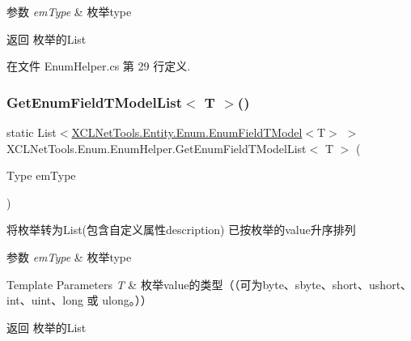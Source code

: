 \begin{DoxyParams}{参数}
{\em em\+Type} & 枚举type\\
\hline
\end{DoxyParams}
\begin{DoxyReturn}{返回}
枚举的\+List
\end{DoxyReturn}


在文件 Enum\+Helper.\+cs 第 29 行定义.

\mbox{\label{class_x_c_l_net_tools_1_1_enum_1_1_enum_helper_a919aa80b589b8038b8db6f731b50556d}} 
\subsubsection{\texorpdfstring{Get\+Enum\+Field\+T\+Model\+List$<$ T $>$()}{GetEnumFieldTModelList< T >()}}
{\footnotesize\ttfamily static List$<$\hyperlink{class_x_c_l_net_tools_1_1_entity_1_1_enum_1_1_enum_field_t_model}{X\+C\+L\+Net\+Tools.\+Entity.\+Enum.\+Enum\+Field\+T\+Model}$<$T$>$ $>$ X\+C\+L\+Net\+Tools.\+Enum.\+Enum\+Helper.\+Get\+Enum\+Field\+T\+Model\+List$<$ T $>$ (\begin{DoxyParamCaption}\item[{Type}]{em\+Type }\end{DoxyParamCaption})\hspace{0.3cm}{\ttfamily [static]}}



将枚举转为\+List(包含自定义属性description) 已按枚举的value升序排列 


\begin{DoxyParams}{参数}
{\em em\+Type} & 枚举type\\
\hline
\end{DoxyParams}

\begin{DoxyTemplParams}{Template Parameters}
{\em T} & 枚举value的类型（（可为byte、sbyte、short、ushort、int、uint、long 或 ulong。））\\
\hline
\end{DoxyTemplParams}
\begin{DoxyReturn}{返回}
枚举的\+List
\end{DoxyReturn}



